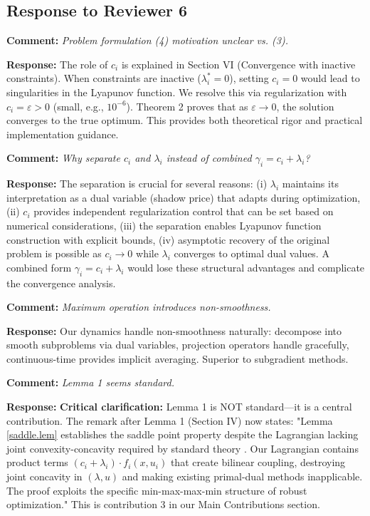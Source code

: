 \documentclass[journal,twoside,web]{ieeecolor}
\begin{document}
\subsection*{Response to Reviewer 6}

\textbf{Comment:} \textit{Problem formulation (4) motivation unclear vs. (3).}

\textbf{Response:} The role of $c_i$ is explained in Section VI (Convergence with inactive constraints). When constraints are inactive ($\lambda_i^* = 0$), setting $c_i = 0$ would lead to singularities in the Lyapunov function. We resolve this via regularization with $c_i = \varepsilon > 0$ (small, e.g., $10^{-6}$). Theorem 2 proves that as $\varepsilon \to 0$, the solution converges to the true optimum. This provides both theoretical rigor and practical implementation guidance.

\textbf{Comment:} \textit{Why separate $c_i$ and $\lambda_i$ instead of combined $\gamma_i = c_i + \lambda_i$?}

\textbf{Response:} The separation is crucial for several reasons: (i) $\lambda_i$ maintains its interpretation as a dual variable (shadow price) that adapts during optimization, (ii) $c_i$ provides independent regularization control that can be set based on numerical considerations, (iii) the separation enables Lyapunov function construction with explicit bounds, (iv) asymptotic recovery of the original problem is possible as $c_i \to 0$ while $\lambda_i$ converges to optimal dual values. A combined form $\gamma_i = c_i + \lambda_i$ would lose these structural advantages and complicate the convergence analysis.

\textbf{Comment:} \textit{Maximum operation introduces non-smoothness.}

\textbf{Response:} Our dynamics handle non-smoothness naturally: decompose into smooth subproblems via dual variables, projection operators handle gracefully, continuous-time provides implicit averaging. Superior to subgradient methods.

\textbf{Comment:} \textit{Lemma 1 seems standard.}

\textbf{Response:} \textbf{Critical clarification:} Lemma 1 is NOT standard—it is a central contribution. The remark after Lemma 1 (Section IV) now states: "Lemma \ref{saddle.lem} establishes the saddle point property despite the Lagrangian lacking joint convexity-concavity required by standard theory \cite{boyd2004,rockafellar1970}. Our Lagrangian contains product terms $(c_i+\lambda_i) \cdot f_i(x,u_i)$ that create bilinear coupling, destroying joint concavity in $(\lambda,u)$ and making existing primal-dual methods \cite{arrow1958,feijer2010} inapplicable. The proof exploits the specific min-max-max-min structure of robust optimization." This is contribution 3 in our Main Contributions section.
\end{document}
